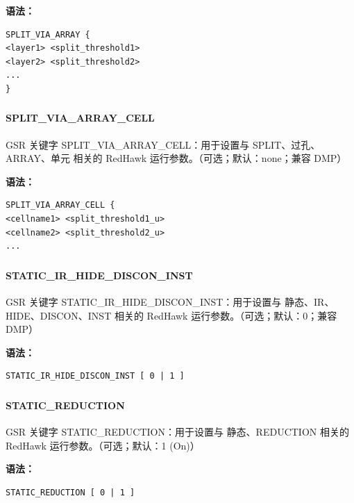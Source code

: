 \textbf{语法：}
\begin{lstlisting}
SPLIT_VIA_ARRAY {
<layer1> <split_threshold1>
<layer2> <split_threshold2>
...
}
\end{lstlisting}

\subsubsection{}
\paragraph*{SPLIT_VIA_ARRAY_CELL}

GSR 关键字 SPLIT_VIA_ARRAY_CELL：用于设置与 SPLIT、过孔、ARRAY、单元 相关的 RedHawk 运行参数。（可选；默认：none；兼容 DMP）

\textbf{语法：}
\begin{lstlisting}
SPLIT_VIA_ARRAY_CELL {
<cellname1> <split_threshold1_u>
<cellname2> <split_threshold2_u>
...
\end{lstlisting}

\subsubsection{}
\paragraph*{STATIC_IR_HIDE_DISCON_INST}

GSR 关键字 STATIC_IR_HIDE_DISCON_INST：用于设置与 静态、IR、HIDE、DISCON、INST 相关的 RedHawk 运行参数。（可选；默认：0；兼容 DMP）

\textbf{语法：}
\begin{lstlisting}
STATIC_IR_HIDE_DISCON_INST [ 0 | 1 ]
\end{lstlisting}

\subsubsection{}
\paragraph*{STATIC_REDUCTION}

GSR 关键字 STATIC_REDUCTION：用于设置与 静态、REDUCTION 相关的 RedHawk 运行参数。（可选；默认：1 (On)）

\textbf{语法：}
\begin{lstlisting}
STATIC_REDUCTION [ 0 | 1 ]
\end{lstlisting}


